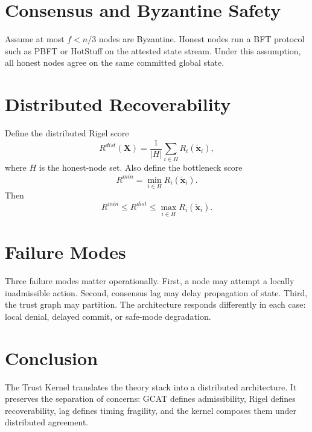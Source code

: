 \documentclass[letterpaper,10pt,conference]{ieeeconf}
\newcommand{\xt}{\tilde{\mathbf{x}}}
\newcommand{\Ri}{R_i}
\begin{document}
\section{Consensus and Byzantine Safety}
Assume at most $f<n/3$ nodes are Byzantine. Honest nodes run a BFT protocol such as PBFT or HotStuff on the attested state stream. Under this assumption, all honest nodes agree on the same committed global state.
\section{Distributed Recoverability}
Define the distributed Rigel score
\[
R^{dist}(\mathbf{X})=\frac{1}{|H|}\sum_{i\in H} \Ri(\xt_i),
\]
where $H$ is the honest-node set. Also define the bottleneck score
\[
R^{min}=\min_{i\in H}\Ri(\xt_i).
\]
Then
\[
R^{min}\le R^{dist}\le \max_{i\in H}\Ri(\xt_i).
\]
\section{Failure Modes}
Three failure modes matter operationally. First, a node may attempt a locally inadmissible action. Second, consensus lag may delay propagation of state. Third, the trust graph may partition. The architecture responds differently in each case: local denial, delayed commit, or safe-mode degradation.
\section{Conclusion}
The Trust Kernel translates the theory stack into a distributed architecture. It preserves the separation of concerns: GCAT defines admissibility, Rigel defines recoverability, lag defines timing fragility, and the kernel composes them under distributed agreement.
\end{document}

